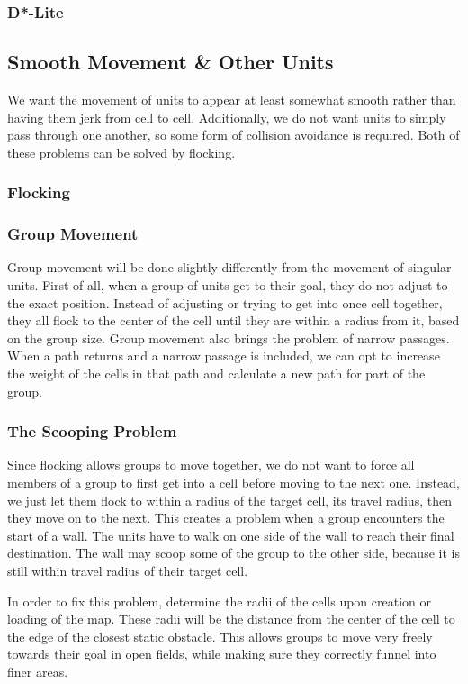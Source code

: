 \subsubsection{D*-Lite}

\subsection{Smooth Movement \& Other Units}
We want the movement of units to appear at least somewhat smooth rather than having them jerk from cell to cell. Additionally, we do not want units to simply pass through one another, so some form of collision avoidance is required. Both of these problems can be solved by flocking.

\subsubsection{Flocking}

\subsubsection{Group Movement}
Group movement will be done slightly differently from the movement of singular units. First of all, when a group of units get to their goal, they do not adjust to the exact position. Instead of adjusting or trying to get into once cell together, they all flock to the center of the cell until they are within a radius from it, based on the group size. Group movement also brings the problem of narrow passages. When a path returns and a narrow passage is included, we can opt to increase the weight of the cells in that path and calculate a new path for part of the group.

\subsubsection{The Scooping Problem}
Since flocking allows groups to move together, we do not want to force all members of a group to first get into a cell before moving to the next one. Instead, we just let them flock to within a radius of the target cell, its travel radius, then they move on to the next. This creates a problem when a group encounters the start of a wall. The units have to walk on one side of the wall to reach their final destination. The wall may scoop some of the group to the other side, because it is still within travel radius of their target cell.

In order to fix this problem, determine the radii of the cells upon creation or loading of the map. These radii will be the distance from the center of the cell to the edge of the closest static obstacle. This allows groups to move very freely towards their goal in open fields, while making sure they correctly funnel into finer areas.

